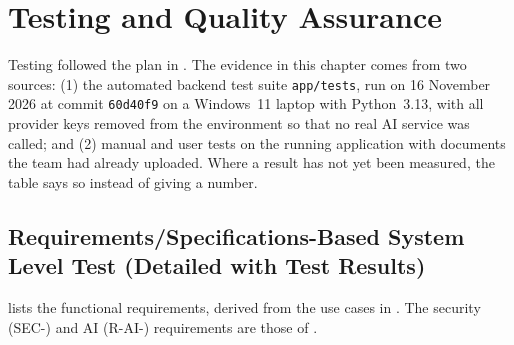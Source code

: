 \chapter{Testing and Quality Assurance}\label{ch:test}

Testing followed the plan in . The evidence in this chapter comes from two sources:
(1) the automated backend test suite \texttt{app/tests}, run on 16 November 2026 at commit \texttt{60d40f9} on
a Windows~11 laptop with Python~3.13, with all provider keys removed from the environment so that no real AI
service was called; and (2) manual and user tests on the running application with documents the team had
already uploaded. Where a result has not yet been
measured, the table says so instead of giving a number.

\section{Requirements/Specifications-Based System Level Test (Detailed with Test Results)}

 lists the functional requirements, derived from the use cases in . The
security (SEC-) and AI (R-AI-) requirements are those of .


